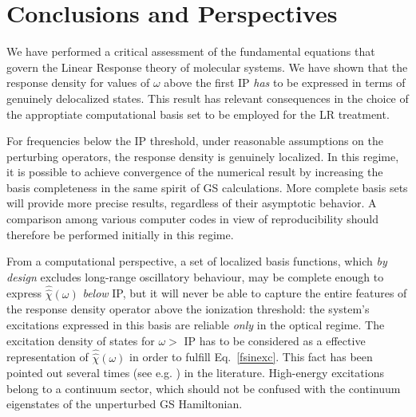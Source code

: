 \documentclass[reprint,aps,prb]{revtex4-1}
\newcommand{\op}[1]{\hat {#1}}
\newcommand{\sop}[1]{\op{\op {#1}}}
\begin{document}
\section{Conclusions and Perspectives}
We have performed a critical assessment of the fundamental equations
that govern the Linear Response theory of molecular systems.
We have
shown that the response density for values of $\omega$ above the first IP
\emph{has} to be expressed in terms of genuinely delocalized states. This
result
has relevant consequences in the choice of the  approptiate computational
basis set to be employed for the LR treatment.

For frequencies below the IP threshold,
under reasonable assumptions on the perturbing operators,
the response density is genuinely localized.
In this regime, it is possible to achieve convergence of the numerical result
by increasing the basis completeness in the same spirit of GS calculations.
More complete basis sets will provide more precise results, regardless of their asymptotic behavior.
A comparison among various computer codes in view of reproducibility should therefore be performed
initially in this regime.



From a computational perspective, a set of localized basis functions,
which \emph{by design} excludes long-range oscillatory behaviour,
may be complete enough to express $\sop \chi(\omega)$ \emph{below} IP,
but it will never be able to capture the entire features of the
response density operator above the ionization threshold:
the system's excitations expressed in this basis are reliable \emph{only} in the optical regime. The excitation density of states for $\omega >$ IP
has to be considered as a effective representation of $\sop \chi(\omega)$
in order to fulfill Eq.~\eqref{fsinexc}. This fact has been pointed out several times (see e.g. \cite{giustino2012,giustino2014}) in the literature.
High-energy excitations belong to a continuum sector, which should not be
confused
with the continuum eigenstates of the
unperturbed GS Hamiltonian.
\end{document}
